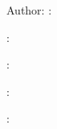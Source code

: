 %

\begingroup
\thispagestyle{empty}
\large
\begin{center}

  \Huge\MakeUppercase{\myUniversity}


  \Large{\MakeUppercase{\mySchool}}

  \vspace{7mm}

  \Large\textbf{\myDegreefull}

  \vspace{1cm}

  \Large\textbf{\myWorkTypeFull}

  \vspace{1cm}

  \Large\textbf{\myBookTitle}

  \vspace{1cm}

  \ifEnglish
  {
    Author: \myAuthorFullName
  }
  {
    \CapitalizeFirstLetter{\wordAutorOrAutora}: \myAuthorFullName
  }

  \vspace{1mm}

  \ifEnglish
  {
    \CapitalizeFirstLetter{\wordAdvisor}: \myAcademicTutorFullName{}

    \ifCoTutorPresent
    {
      \CapitalizeFirstLetter{\wordCoAdvisor}: \myCoTutorFullName{}
    }
    {
    }
  }
  {%
    : \myAcademicTutorFullName{}

    \ifCoTutorPresent
    {
      : \myCoTutorFullName{}
    }
    {
    }
  }

  \vspace{1cm}


\end{center}
